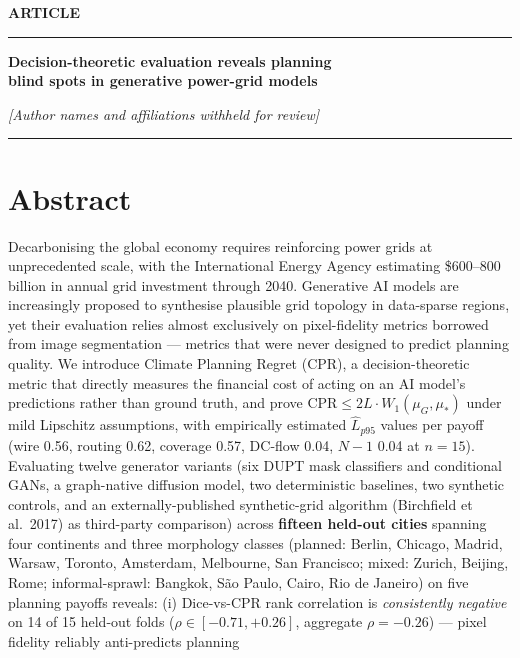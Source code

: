 \documentclass[10pt,a4paper]{article}
\newcommand{\paperkind}{\noindent\textbf{\color{NEblue}\sffamily ARTICLE}\par\vspace{2pt}\textcolor{NEblue}{\rule{\linewidth}{0.4pt}}\par\vspace{6pt}}
\begin{document}
\thispagestyle{fancy}

\paperkind

{\color{NEblue}\sffamily\bfseries\Large
Decision-theoretic evaluation reveals planning\\
blind spots in generative power-grid models\par}

\vspace{8pt}

\textit{[Author names and affiliations withheld for review]}

\vspace{6pt}\textcolor{NEblue}{\rule{\linewidth}{0.4pt}}\par\vspace{6pt}

\section*{Abstract}
\noindent
Decarbonising the global economy requires reinforcing power grids
at unprecedented scale, with the International Energy Agency
estimating \$600--800 billion in annual grid investment through
2040. Generative AI models are increasingly proposed to synthesise
plausible grid topology in data-sparse regions, yet their
evaluation relies almost exclusively on pixel-fidelity metrics
borrowed from image segmentation --- metrics that were never
designed to predict planning quality. We introduce Climate Planning
Regret (CPR), a decision-theoretic metric that directly measures
the financial cost of acting on an AI model's predictions rather
than ground truth, and prove $\mathrm{CPR} \le 2 L \cdot W_1(\mu_G, \mu_*)$
under mild Lipschitz assumptions, with empirically estimated
$\hat L_{p95}$ values per payoff (wire 0.56, routing 0.62,
coverage 0.57, DC-flow 0.04, $N{-}1$ 0.04 at $n=15$). Evaluating
twelve generator variants (six DUPT mask classifiers and conditional
GANs, a graph-native diffusion model, two deterministic baselines,
two synthetic controls, and an externally-published synthetic-grid
algorithm (Birchfield et al.\ 2017) as third-party comparison)
across \textbf{fifteen held-out cities}
spanning four continents and three morphology classes (planned:
Berlin, Chicago, Madrid, Warsaw, Toronto, Amsterdam, Melbourne, San
Francisco; mixed: Zurich, Beijing, Rome; informal-sprawl: Bangkok,
São Paulo, Cairo, Rio de Janeiro) on five planning payoffs reveals:
(i) Dice-vs-CPR rank correlation is \emph{consistently negative} on
14 of 15 held-out folds ($\rho \in [-0.71, +0.26]$, aggregate
$\rho = -0.26$) --- pixel fidelity reliably anti-predicts planning
\end{document}
